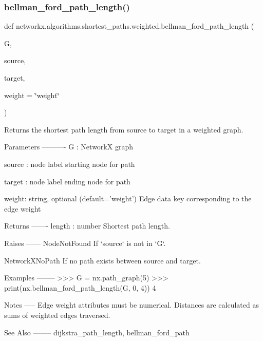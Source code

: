 \subsubsection{\texorpdfstring{bellman\+\_\+ford\+\_\+path\+\_\+length()}{bellman\_ford\_path\_length()}}
{\footnotesize\ttfamily def networkx.\+algorithms.\+shortest\+\_\+paths.\+weighted.\+bellman\+\_\+ford\+\_\+path\+\_\+length (\begin{DoxyParamCaption}\item[{}]{G,  }\item[{}]{source,  }\item[{}]{target,  }\item[{}]{weight = {\ttfamily \char`\"{}weight\char`\"{}} }\end{DoxyParamCaption})}

\begin{DoxyVerb}Returns the shortest path length from source to target
in a weighted graph.

Parameters
----------
G : NetworkX graph

source : node label
    starting node for path

target : node label
    ending node for path

weight: string, optional (default='weight')
    Edge data key corresponding to the edge weight

Returns
-------
length : number
    Shortest path length.

Raises
------
NodeNotFound
    If `source` is not in `G`.

NetworkXNoPath
    If no path exists between source and target.

Examples
--------
>>> G = nx.path_graph(5)
>>> print(nx.bellman_ford_path_length(G, 0, 4))
4

Notes
-----
Edge weight attributes must be numerical.
Distances are calculated as sums of weighted edges traversed.

See Also
--------
dijkstra_path_length, bellman_ford_path
\end{DoxyVerb}
 \mbox{\label{namespacenetworkx_1_1algorithms_1_1shortest__paths_1_1weighted_a3e0a3e61a52f47e5fd682a4df34aad6c}} 
